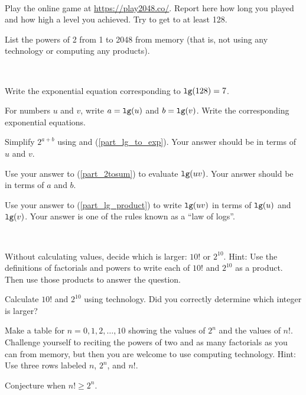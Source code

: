 \begin{exer}[\exerE] %
\label{2048 game}
~
    \begin{exerpart}
        \item Play the online game  at \url{https://play2048.co/}.  Report here how long you played and how high a level you achieved. Try to get to at least 128.
        \item List the powers of 2 from 1 to 2048 from memory (that is, not using any technology or computing any products).
    \end{exerpart}
\end{exer}

\begin{exer}[\exerE] %
\label{exer_defn_lg}  
~
    \begin{exerpart}
        \item Write the exponential equation corresponding to $\texttt{lg}(128) = 7$.
        \item \label{part_lg_to_exp} For numbers $u$ and $v$, write $a=\texttt{lg}(u)$ and $b=\texttt{lg}(v)$. Write the corresponding exponential equations.
        \item \label{part_2tosum} Simplify $2^{a+b}$ using  and (\ref{part_lg_to_exp}).  Your answer should be in terms of $u$ and $v$.        
        \item \label{part_lg_product} Use your answer to (\ref{part_2tosum}) to evaluate $\texttt{lg}(uv)$.  Your answer should be in terms of $a$ and $b$.
        \item Use your answer to (\ref{part_lg_product}) to write $\texttt{lg}(uv)$ in terms of $\texttt{lg}(u)$ and $\texttt{lg}(v)$. Your answer is one of the rules known as a ``law of logs''.
    \end{exerpart}
\end{exer}

\begin{exer}[\exerE] %
\label{exer_power_vs_factorial} 
~
    \begin{exerpart}
        \item Without calculating values, decide which is larger: $10!$ or $2^{10}$.  Hint: Use the definitions of factorials and powers to write each of $10!$ and $2^{10}$ as a product. Then use those products to answer the question.
        \item Calculate $10!$ and $2^{10}$ using technology. Did you correctly determine which integer is larger?
        \item Make a table for $n = 0, 1, 2, \ldots, 10$ showing the values of $2^n$ and the values of $n!$. Challenge yourself to reciting the powers of two and as many factorials as you can from memory, but then you are welcome to use computing technology. Hint: Use three rows labeled $n$, $2^n$, and $n!$.
        \item Conjecture when $n! \ge 2^n$. 
    \end{exerpart}
\end{exer}

